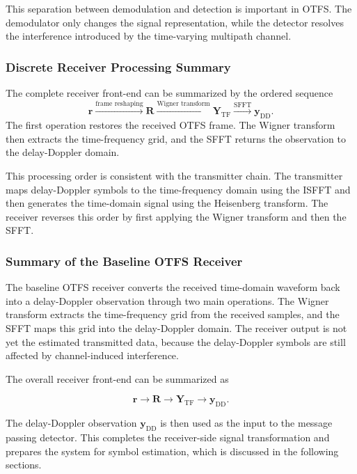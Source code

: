 This separation between demodulation and detection is important in OTFS. The demodulator only changes the signal representation, while the detector resolves the interference introduced by the time-varying multipath channel.

\subsubsection{Discrete Receiver Processing Summary}

The complete receiver front-end can be summarized by the ordered sequence
\begin{equation}
    \mathbf{r}
    \xrightarrow{\text{frame reshaping}}
    \mathbf{R}
    \xrightarrow{\text{Wigner transform}}
    \mathbf{Y}_{\mathrm{TF}}
    \xrightarrow{\text{SFFT}}
    \mathbf{y}_{\mathrm{DD}} .
    \label{eq:receiver_discrete_summary}
\end{equation}
The first operation restores the received OTFS frame. The Wigner transform then extracts the time-frequency grid, and the SFFT returns the observation to the delay-Doppler domain.

This processing order is consistent with the transmitter chain. The transmitter maps delay-Doppler symbols to the time-frequency domain using the ISFFT and then generates the time-domain signal using the Heisenberg transform. The receiver reverses this order by first applying the Wigner transform and then the SFFT.

\subsubsection{Summary of the Baseline OTFS Receiver}

The baseline OTFS receiver converts the received time-domain waveform back into a delay-Doppler observation through two main operations. The Wigner transform extracts the time-frequency grid from the received samples, and the SFFT maps this grid into the delay-Doppler domain. The receiver output is not yet the estimated transmitted data, because the delay-Doppler symbols are still affected by channel-induced interference.

The overall receiver front-end can be summarized as

\begin{equation}
    \mathbf{r}
    \rightarrow
    \mathbf{R}
    \rightarrow
    \mathbf{Y}_{\mathrm{TF}}
    \rightarrow
    \mathbf{y}_{\mathrm{DD}} .
\end{equation}

The delay-Doppler observation \(\mathbf{y}_{\mathrm{DD}}\) is then used as the input to the message passing detector. This completes the receiver-side signal transformation and prepares the system for symbol estimation, which is discussed in the following sections.
